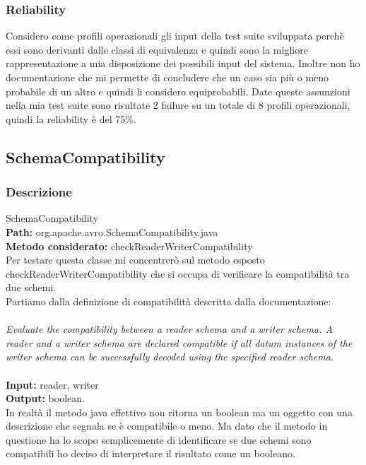 \documentclass[10pt, a4paper]{article}
\begin{document}
\subsubsection{Reliability}
Considero come profili operazionali gli input della test suite sviluppata perchè essi sono derivanti dalle classi di equivalenza
e quindi sono la migliore rappresentazione a mia disposizione dei possibili input del sistema. Inoltre non ho documentazione che
mi permette di concludere che un caso sia più o meno probabile di un altro e quindi li considero equiprobabili. Date queste 
assunzioni nella mia test suite sono risultate 2 failure su un totale di 8 profili operazionali, quindi la reliability è del 75\%.
\subsection{SchemaCompatibility}

\subsubsection{Descrizione}

SchemaCompatibility \\
\textbf{Path:} org.apache.avro.SchemaCompatibility.java \\
\textbf{Metodo considerato:} checkReaderWriterCompatibility \\

Per testare questa classe mi concentrerò sul metodo esposto checkReaderWriterCompatibility che
si occupa di verificare la compatibilità tra due schemi. \\
Partiamo dalla definizione di compatibilità descritta dalla documentazione: \\\\
\textit{Evaluate the compatibility between a reader schema and a writer schema. A
reader and a writer schema are declared compatible if all datum instances of
the writer schema can be successfully decoded using the specified reader 
schema.} \\ \\
\textbf{Input:} reader, writer \\
\textbf{Output:} boolean. \\
In realtà il metodo java effettivo non ritorna un boolean ma un oggetto con una descrizione che segnala se è 
compatibile o meno. Ma dato che il metodo in questione ha lo scopo semplicemente di identificare se due schemi sono compatibili
ho deciso di interpretare il risultato come un booleano.
\end{document}
